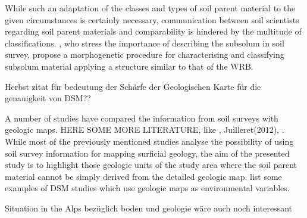 \documentclass[preprint,12pt,authoryear]{elsarticle}
\begin{document}
While such an adaptation of the classes and types of soil parent material to the given circumstances is certainly necessary, communication between soil scientists regarding soil parent materials and comparability is hindered by the multitude of classifications. \cite{Juilleret2016}, who stress the importance of describing the subsolum in soil survey, propose a morphogenetic procedure for characterising and classifying subsolum material applying a structure similar to that of the WRB.

Herbst zitat für bedeutung der Schärfe der Geologischen Karte für die genauigkeit von DSM??



A number of studies have compared the information from soil surveys with geologic maps. HERE SOME MORE LITERATURE, like \cite{Miller2015a}, Juilleret(2012), \cite{Brevik2015}. While most of the previously mentioned studies analyse the possibility of using soil survey information for mapping surficial geology, the aim of the presented study is to highlight those geologic units of the study area where the soil parent material cannot be simply derived from the detailed geologic map. \cite{McBratney2003} list some examples of DSM studies which use geologic maps as environmental variables.




 {Situation in the Alps bez{\"u}glich boden und geologie w{\"a}re auch noch interessant}
\end{document}
